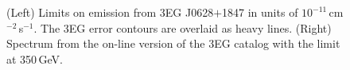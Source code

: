 \begin{figure}[p]
\caption{\label{FIG::OBSERVATIONS::J0628} (Left) Limits on 
emission from 3EG J0628$+$1847 in units of
$10^{-11}$\,cm$^{-2}$\,s$^{-1}$. The 3EG error contours are overlaid
as heavy lines. (Right) Spectrum from the on-line version of the 3EG
catalog with the limit at 350\,GeV.}
\end{figure}

